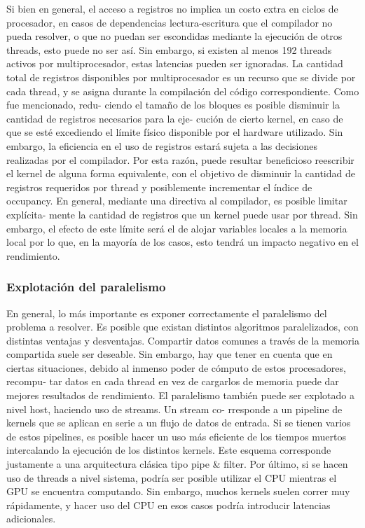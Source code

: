 \documentclass[a4paper,10pt]{report}
\begin{document}
Si bien en general, el acceso a registros no implica un costo extra en ciclos de procesador, en casos de
dependencias lectura-escritura que el compilador no pueda resolver, o que no puedan ser escondidas
mediante la ejecución de otros threads, esto puede no ser así. Sin embargo, si existen al menos 192
threads activos por multiprocesador, estas latencias pueden ser ignoradas.
La cantidad total de registros disponibles por multiprocesador es un recurso que se divide por cada
thread, y se asigna durante la compilación del código correspondiente. Como fue mencionado, redu-
ciendo el tamaño de los bloques es posible disminuir la cantidad de registros necesarios para la eje-
cución de cierto kernel, en caso de que se esté excediendo el límite físico disponible por el hardware
utilizado. Sin embargo, la eficiencia en el uso de registros estará sujeta a las decisiones realizadas por el
compilador. Por esta razón, puede resultar beneficioso reescribir el kernel de alguna forma equivalente,
con el objetivo de disminuir la cantidad de registros requeridos por thread y posiblemente incrementar
el índice de occupancy. En general, mediante una directiva al compilador, es posible limitar explícita-
mente la cantidad de registros que un kernel puede usar por thread. Sin embargo, el efecto de este límite
será el de alojar variables locales a la memoria local por lo que, en la mayoría de los casos, esto tendrá
un impacto negativo en el rendimiento.


\subsubsection{Explotación del paralelismo}

En general, lo más importante es exponer correctamente el paralelismo del problema a resolver. Es
posible que existan distintos algoritmos paralelizados, con distintas ventajas y desventajas. Compartir
datos comunes a través de la memoria compartida suele ser deseable. Sin embargo, hay que tener en
cuenta que en ciertas situaciones, debido al inmenso poder de cómputo de estos procesadores, recompu-
tar datos en cada thread en vez de cargarlos de memoria puede dar mejores resultados de rendimiento.
El paralelismo también puede ser explotado a nivel host, haciendo uso de streams. Un stream co-
rresponde a un pipeline de kernels que se aplican en serie a un flujo de datos de entrada. Si se tienen
varios de estos pipelines, es posible hacer un uso más eficiente de los tiempos muertos intercalando la
ejecución de los distintos kernels. Este esquema corresponde justamente a una arquitectura clásica tipo
pipe \& filter.
Por último, si se hacen uso de threads a nivel sistema, podría ser posible utilizar el CPU mientras el
GPU se encuentra computando. Sin embargo, muchos kernels suelen correr muy rápidamente, y hacer
uso del CPU en esos casos podría introducir latencias adicionales.
\end{document}
